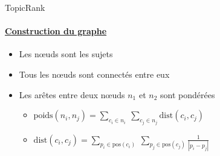 \begin{frame}[label=construction_du_graphe]{TopicRank}\framesubtitle{\hyperlink{topicrank_back}{Construction du graphe}}
  \begin{itemize}
    \item{Les n\oe{}uds sont les sujets}
    \item{Tous les n\oe{}uds sont connectés entre eux}
    \item{Les arêtes entre deux n\oe{}uds $n_1$ et $n_2$ sont pondérées}
    \begin{itemize}
      \item{$\text{poids}(n_i, n_j) = \sum_{c_i \in n_i}\ \sum_{c_j \in n_j} \text{dist}(c_i, c_j)$}
      \item{$\text{dist}(c_i, c_j) = \sum_{p_i \in \text{pos}(c_i)}\ \sum_{p_j \in \text{pos}(c_j)} \frac{1}{|p_i - p_j|}$}
    \end{itemize}
  \end{itemize}
\end{frame}

